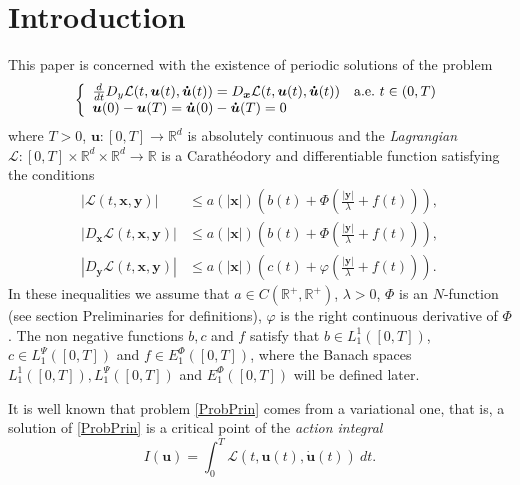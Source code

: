 \documentclass[twoside]{elsarticle}
\theoremstyle{remark}
\newcommand{\lpsi}{L^{\Psi}}
\newcommand{\ephi}{E^{\Phi}}
\renewcommand{\b}[1]{\boldsymbol{#1}}
\newcommand{\rr}{\mathbb{R}}
\renewcommand{\leq}{\leqslant}
\begin{document}
%
%


\section{Introduction}
This paper is concerned with the existence of periodic solutions of the problem
\begin{equation}\label{ProbPrin}
    \left\{%
\begin{array}{ll}
   \frac{d}{dt} D_{y}\mathcal{L}(t,\b{u}(t),\b{\dot{u}}(t))= D_{\b{x}}\mathcal{L}(t,\b{u}(t),\b{\dot{u}}(t)) \quad \hbox{a.e.}\ t \in (0,T)\\
    \b{u}(0)-\b{u}(T)=\b{\dot{u}}(0)-\b{\dot{u}}(T)=0
\end{array}%
\right.
\end{equation}
where $T>0$, $\b{u}:[0,T]\to\rr^d$ is absolutely continuous and the \emph{Lagrangian} $\mathcal{L}:[0,T]\times\rr^d\times\rr^d\to\rr$ is a Carath\'eodory and differentiable function satisfying the conditions
\begin{eqnarray}
|\mathcal{L}(t,\b{x},\b{y})| &\leq a(|\b{x}|)\left(b(t)+ \Phi\left(\frac{|\b{y}|}{\lambda}+f(t) \right)\right),\label{cotaL}\\
|D_{\b{x}}\mathcal{L}(t,\b{x},\b{y})| &\leq a(|\b{x}|)\left(b(t)+ \Phi\left(\frac{|\b{y}|}{\lambda}+f(t) \right)\right),\label{cotaDxL}\\
|D_{\b{y}}\mathcal{L}(t,\b{x},\b{y})| &\leq a(|\b{x}|)\left(c(t)+ \varphi\left(\frac{|\b{y}|}{\lambda}+f(t)\right)  \right).\label{cotaDyL}
\end{eqnarray}
In these inequalities we assume that  $a\in C(\mathbb{R}^+,\mathbb{R}^+)$, $\lambda>0$, $\Phi$ is an $N$-function (see section  Preliminaries  for definitions), $\varphi$ is the right continuous derivative of $\Phi$. The non negative functions $b,c$ and $f$ satisfy that  $b\in L^1_1([0,T]) $,  $c\in\lpsi_1([0,T])$ and  $f\in \ephi_1([0,T])$, where  the Banach spaces $ L^1_1([0,T]), \lpsi_1([0,T])$ and  $\ephi_1([0,T])$  will be defined later.



It is well known that problem \eqref{ProbPrin} comes from a variational one, that is,  a solution of \eqref{ProbPrin}  
is a critical point of the \emph{action integral}
\begin{equation}\label{integral_accion}
I(\b{u})=\int_{0}^T \mathcal{L}(t,\b{u}(t),\b{\dot{u}}(t))\ dt.
\end{equation}
\end{document}
